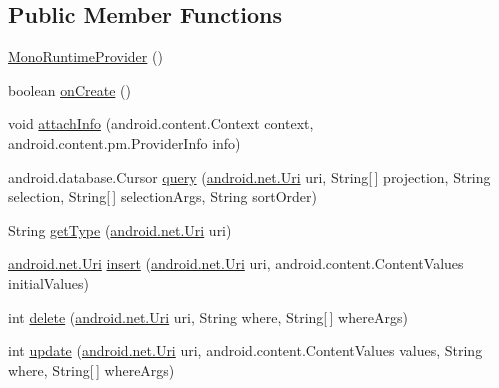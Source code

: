 \subsection*{Public Member Functions}
\begin{DoxyCompactItemize}
\item 
\hyperlink{classmono_1_1_mono_runtime_provider_a7a06cc58b7a7891aa5f1e523206a5249}{Mono\+Runtime\+Provider} ()
\item 
boolean \hyperlink{classmono_1_1_mono_runtime_provider_ac5640d3ce8472accc1953fe591e683c3}{on\+Create} ()
\item 
void \hyperlink{classmono_1_1_mono_runtime_provider_a4fb9f5a38268fb642d211e7ef0fd9228}{attach\+Info} (android.\+content.\+Context context, android.\+content.\+pm.\+Provider\+Info info)
\item 
android.\+database.\+Cursor \hyperlink{classmono_1_1_mono_runtime_provider_a5f038667e16324d54f940968f4abd86f}{query} (\hyperlink{_document_fragment_8cs_a47e1c021f31487018530532b06f1b87a}{android.\+net.\+Uri} uri, String\mbox{[}$\,$\mbox{]} projection, String selection, String\mbox{[}$\,$\mbox{]} selection\+Args, String sort\+Order)
\item 
String \hyperlink{classmono_1_1_mono_runtime_provider_ab7978ccd79378f86aabc9a1997bff129}{get\+Type} (\hyperlink{_document_fragment_8cs_a47e1c021f31487018530532b06f1b87a}{android.\+net.\+Uri} uri)
\item 
\hyperlink{_document_fragment_8cs_a47e1c021f31487018530532b06f1b87a}{android.\+net.\+Uri} \hyperlink{classmono_1_1_mono_runtime_provider_afbf0b2575d76132ac379064f3f695013}{insert} (\hyperlink{_document_fragment_8cs_a47e1c021f31487018530532b06f1b87a}{android.\+net.\+Uri} uri, android.\+content.\+Content\+Values initial\+Values)
\item 
int \hyperlink{classmono_1_1_mono_runtime_provider_a20fd29ee82e2fbc6ca8e3a7d53e89b9f}{delete} (\hyperlink{_document_fragment_8cs_a47e1c021f31487018530532b06f1b87a}{android.\+net.\+Uri} uri, String where, String\mbox{[}$\,$\mbox{]} where\+Args)
\item 
int \hyperlink{classmono_1_1_mono_runtime_provider_a70342b01de97d26ab215db961f4a714c}{update} (\hyperlink{_document_fragment_8cs_a47e1c021f31487018530532b06f1b87a}{android.\+net.\+Uri} uri, android.\+content.\+Content\+Values values, String where, String\mbox{[}$\,$\mbox{]} where\+Args)
\end{DoxyCompactItemize}


